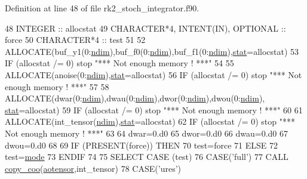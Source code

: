 Definition at line 48 of file rk2\+\_\+stoch\+\_\+integrator.\+f90.


\begin{DoxyCode}
48     \textcolor{keywordtype}{INTEGER} :: allocstat
49     \textcolor{keywordtype}{CHARACTER*4}, \textcolor{keywordtype}{INTENT(IN)}, \textcolor{keywordtype}{OPTIONAL} :: force
50     \textcolor{keywordtype}{CHARACTER*4} :: test
51 
52     \textcolor{keyword}{ALLOCATE}(buf\_y1(0:\hyperlink{namespaceparams_a2323fe1773f086e20c14f266351c482b}{ndim}),buf\_f0(0:\hyperlink{namespaceparams_a2323fe1773f086e20c14f266351c482b}{ndim}),buf\_f1(0:\hyperlink{namespaceparams_a2323fe1773f086e20c14f266351c482b}{ndim}),\hyperlink{namespacestat}{stat}=allocstat)
53     \textcolor{keywordflow}{IF} (allocstat /= 0) stop \textcolor{stringliteral}{"*** Not enough memory ! ***"}
54 
55     \textcolor{keyword}{ALLOCATE}(anoise(0:\hyperlink{namespaceparams_a2323fe1773f086e20c14f266351c482b}{ndim}),\hyperlink{namespacestat}{stat}=allocstat)
56     \textcolor{keywordflow}{IF} (allocstat /= 0) stop \textcolor{stringliteral}{"*** Not enough memory ! ***"}
57 
58     \textcolor{keyword}{ALLOCATE}(dwar(0:\hyperlink{namespaceparams_a2323fe1773f086e20c14f266351c482b}{ndim}),dwau(0:\hyperlink{namespaceparams_a2323fe1773f086e20c14f266351c482b}{ndim}),dwor(0:\hyperlink{namespaceparams_a2323fe1773f086e20c14f266351c482b}{ndim}),dwou(0:\hyperlink{namespaceparams_a2323fe1773f086e20c14f266351c482b}{ndim}),
      \hyperlink{namespacestat}{stat}=allocstat)
59     \textcolor{keywordflow}{IF} (allocstat /= 0) stop \textcolor{stringliteral}{"*** Not enough memory ! ***"}
60 
61     \textcolor{keyword}{ALLOCATE}(int\_tensor(\hyperlink{namespaceparams_a2323fe1773f086e20c14f266351c482b}{ndim}),\hyperlink{namespacestat}{stat}=allocstat)
62     \textcolor{keywordflow}{IF} (allocstat /= 0) stop \textcolor{stringliteral}{"*** Not enough memory ! ***"}
63 
64     dwar=0.d0
65     dwor=0.d0
66     dwau=0.d0
67     dwou=0.d0
68 
69     \textcolor{keywordflow}{IF} (\textcolor{keyword}{PRESENT}(force)) \textcolor{keywordflow}{THEN}
70        test=force
71     \textcolor{keywordflow}{ELSE}
72        test=\hyperlink{namespacestoch__params_a2c3f6439fd2d66413d065b533f2a6263}{mode}
73 \textcolor{keywordflow}{    ENDIF}
74 
75     \textcolor{keywordflow}{SELECT CASE} (test)
76     \textcolor{keywordflow}{CASE}(\textcolor{stringliteral}{'full'})
77        \textcolor{keyword}{CALL }\hyperlink{namespacetensor_a14f95c256cdf137ca0767ddb3c87deea}{copy\_coo}(\hyperlink{namespaceaotensor__def_a0dc43bc9294a18f2fe57b67489f1702f}{aotensor},int\_tensor)
78     \textcolor{keywordflow}{CASE}(\textcolor{stringliteral}{'ures'})

\end{DoxyCode}

